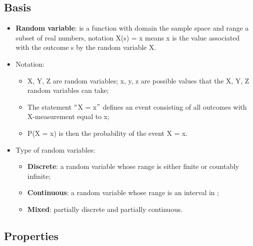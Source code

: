 \documentclass[12pt]{report}
\renewcommand{\_}{\kern-1.5pt\textunderscore\kern-1.5pt}
\begin{document}
\subsection*{Basis}
\begin{itemize}
	\item \textbf{Random variable}: is a function with domain the sample space and range a subset of real numbers, notation X(s) = x means x is the value associated with the outcome s by the random variable X. \par

	\item Notation:\par

\begin{itemize}
	\item X, Y, Z are random variables; x, y, z are possible values that the X, Y, Z random variables can take;\par

	\item The statement $``$X = x$"$  defines an event consisting of all outcomes with X-measurement equal to x;\par

	\item P(X = x) is then the probability of the event X = x.\par


\end{itemize}
	\item Type of random variables:\par

\begin{itemize}
	\item \textbf{Discrete}: a random variable whose range is either finite or countably infinite;\par

	\item \textbf{Continuous}: a random variable whose range is an interval in ;\par

	\item \textbf{Mixed}: partially discrete and partially continuous.\par


\end{itemize}
\end{itemize}\subsection*{Properties}
\end{document}
